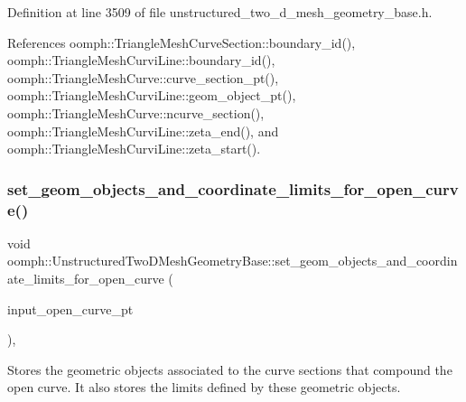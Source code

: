 Definition at line 3509 of file unstructured\+\_\+two\+\_\+d\+\_\+mesh\+\_\+geometry\+\_\+base.\+h.



References oomph\+::\+Triangle\+Mesh\+Curve\+Section\+::boundary\+\_\+id(), oomph\+::\+Triangle\+Mesh\+Curvi\+Line\+::boundary\+\_\+id(), oomph\+::\+Triangle\+Mesh\+Curve\+::curve\+\_\+section\+\_\+pt(), oomph\+::\+Triangle\+Mesh\+Curvi\+Line\+::geom\+\_\+object\+\_\+pt(), oomph\+::\+Triangle\+Mesh\+Curve\+::ncurve\+\_\+section(), oomph\+::\+Triangle\+Mesh\+Curvi\+Line\+::zeta\+\_\+end(), and oomph\+::\+Triangle\+Mesh\+Curvi\+Line\+::zeta\+\_\+start().

\mbox{\label{classoomph_1_1UnstructuredTwoDMeshGeometryBase_ad79be82dd161b1f6e5dc967969f88f6f}} 
\subsubsection{\texorpdfstring{set\+\_\+geom\+\_\+objects\+\_\+and\+\_\+coordinate\+\_\+limits\+\_\+for\+\_\+open\+\_\+curve()}{set\_geom\_objects\_and\_coordinate\_limits\_for\_open\_curve()}}
{\footnotesize\ttfamily void oomph\+::\+Unstructured\+Two\+D\+Mesh\+Geometry\+Base\+::set\+\_\+geom\+\_\+objects\+\_\+and\+\_\+coordinate\+\_\+limits\+\_\+for\+\_\+open\+\_\+curve (\begin{DoxyParamCaption}\item[{\hyperlink{classoomph_1_1TriangleMeshOpenCurve}{Triangle\+Mesh\+Open\+Curve} $\ast$}]{input\+\_\+open\+\_\+curve\+\_\+pt }\end{DoxyParamCaption})\hspace{0.3cm}{\ttfamily [inline]}, {\ttfamily [protected]}}



Stores the geometric objects associated to the curve sections that compound the open curve. It also stores the limits defined by these geometric objects. 



